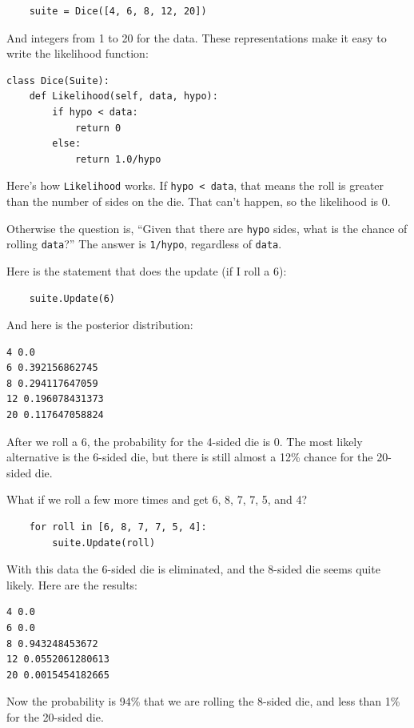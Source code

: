 \documentclass[12pt]{book}
\begin{document}
\begin{verbatim}
    suite = Dice([4, 6, 8, 12, 20])
\end{verbatim}

And integers from 1 to 20 for the data.
These representations make it easy to
write the likelihood function:

\begin{verbatim}
class Dice(Suite):
    def Likelihood(self, data, hypo):
        if hypo < data:
            return 0
        else:
            return 1.0/hypo
\end{verbatim}

Here's how \verb"Likelihood" works.  If \verb"hypo < data", that
means the roll is greater than the number of sides on the die.
That can't happen, so the likelihood is 0.

Otherwise the question is, ``Given that there are {\tt hypo}
sides, what is the chance of rolling {\tt data}?''  The
answer is \verb"1/hypo", regardless of {\tt data}.

Here is the statement that does the update (if I roll a 6):

\begin{verbatim}
    suite.Update(6)
\end{verbatim}

And here is the posterior distribution:

\begin{verbatim}
4 0.0
6 0.392156862745
8 0.294117647059
12 0.196078431373
20 0.117647058824
\end{verbatim}

After we roll a 6, the probability for the 4-sided die is 0.  The
most likely alternative is the 6-sided die, but there is still
almost a 12\% chance for the 20-sided die.

What if we roll a few more times and get 6, 8, 7, 7, 5, and 4?

\begin{verbatim}
    for roll in [6, 8, 7, 7, 5, 4]:
        suite.Update(roll)
\end{verbatim}

With this data the 6-sided die is eliminated, and the 8-sided
die seems quite likely.  Here are the results:

\begin{verbatim}
4 0.0
6 0.0
8 0.943248453672
12 0.0552061280613
20 0.0015454182665
\end{verbatim}

Now the probability is 94\% that we are rolling the 8-sided die,
and less than 1\% for the 20-sided die.
\end{document}
